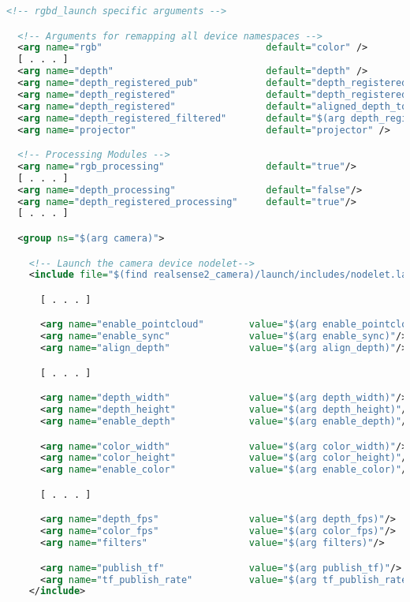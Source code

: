 \begin{lstlisting}[language=xml]
  <!-- rgbd_launch specific arguments -->

  <!-- Arguments for remapping all device namespaces -->
  <arg name="rgb"                             default="color" />
  [ . . . ]
  <arg name="depth"                           default="depth" />
  <arg name="depth_registered_pub"            default="depth_registered" />
  <arg name="depth_registered"                default="depth_registered" unless="$(arg align_depth)" />
  <arg name="depth_registered"                default="aligned_depth_to_color" if="$(arg align_depth)" />
  <arg name="depth_registered_filtered"       default="$(arg depth_registered)" />
  <arg name="projector"                       default="projector" />

  <!-- Processing Modules -->
  <arg name="rgb_processing"                  default="true"/>
  [ . . . ]
  <arg name="depth_processing"                default="false"/>
  <arg name="depth_registered_processing"     default="true"/>
  [ . . . ]

  <group ns="$(arg camera)">

    <!-- Launch the camera device nodelet-->
    <include file="$(find realsense2_camera)/launch/includes/nodelet.launch.xml">

      [ . . . ]

      <arg name="enable_pointcloud"        value="$(arg enable_pointcloud)"/>
      <arg name="enable_sync"              value="$(arg enable_sync)"/>
      <arg name="align_depth"              value="$(arg align_depth)"/>

      [ . . . ]

      <arg name="depth_width"              value="$(arg depth_width)"/>
      <arg name="depth_height"             value="$(arg depth_height)"/>
      <arg name="enable_depth"             value="$(arg enable_depth)"/>

      <arg name="color_width"              value="$(arg color_width)"/>
      <arg name="color_height"             value="$(arg color_height)"/>
      <arg name="enable_color"             value="$(arg enable_color)"/>

      [ . . . ]

      <arg name="depth_fps"                value="$(arg depth_fps)"/>
      <arg name="color_fps"                value="$(arg color_fps)"/>
      <arg name="filters"                  value="$(arg filters)"/>

      <arg name="publish_tf"               value="$(arg publish_tf)"/>
      <arg name="tf_publish_rate"          value="$(arg tf_publish_rate)"/>
    </include>


\end{lstlisting}
